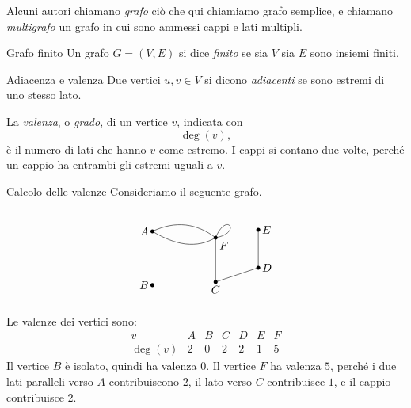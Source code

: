 \documentclass[a4paper]{article}
\begin{document}
Alcuni autori chiamano \emph{grafo} ciò che qui chiamiamo grafo semplice, e chiamano \emph{multigrafo} un grafo in cui sono ammessi cappi e lati multipli.

\begin{snippetdefinition}{Grafo finito}
    Un grafo \(G=(V,E)\) si dice \emph{finito} se sia \(V\) sia \(E\) sono insiemi finiti.
\end{snippetdefinition}

\begin{snippetdefinition}{Adiacenza e valenza}
    Due vertici \(u,v\in V\) si dicono \emph{adiacenti} se sono estremi di uno stesso lato.

    La \emph{valenza}, o \emph{grado}, di un vertice \(v\), indicata con
    \[
        \deg(v),
    \]
    è il numero di lati che hanno \(v\) come estremo. I cappi si contano due volte, perché un cappio ha entrambi gli estremi uguali a \(v\).
\end{snippetdefinition}

\begin{snippetexample}{Calcolo delle valenze}
    Consideriamo il seguente grafo.

    \[
        \begin{tikzpicture}[scale=1]
            \coordinate (A) at (-2,0.8);
            \coordinate (B) at (-2,-0.9);
            \coordinate (F) at (0,0.6);
            \coordinate (C) at (0,-0.8);
            \coordinate (D) at (1.35,-0.35);
            \coordinate (E) at (1.35,0.85);

            \node[left] at (A) {\(A\)};
            \node[left] at (B) {\(B\)};
            \node[below right] at (F) {\(F\)};
            \node[below] at (C) {\(C\)};
            \node[right] at (D) {\(D\)};
            \node[right] at (E) {\(E\)};

            \draw (A) .. controls (-1.25,1.15) and (-0.6,1.05) .. (F);
            \draw (A) .. controls (-1.25,0.35) and (-0.6,0.25) .. (F);
            \draw (F)--(C);
            \draw (C)--(D);
            \draw (D)--(E);
            \draw (F) .. controls +(0.35,0.85) and +(0.85,0.15) .. (F);

            \foreach \p in {A,B,C,D,E,F}{
                \fill (\p) circle (1.8pt);
            }
        \end{tikzpicture}
    \]

    Le valenze dei vertici sono:
    \[
        \begin{array}{c|cccccc}
            v & A & B & C & D & E & F \\
            \hline
            \deg(v) & 2 & 0 & 2 & 2 & 1 & 5
        \end{array}
    \]
    Il vertice \(B\) è isolato, quindi ha valenza \(0\). Il vertice \(F\) ha valenza \(5\), perché i due lati paralleli verso \(A\) contribuiscono \(2\), il lato verso \(C\) contribuisce \(1\), e il cappio contribuisce \(2\).
\end{snippetexample}
\end{document}
